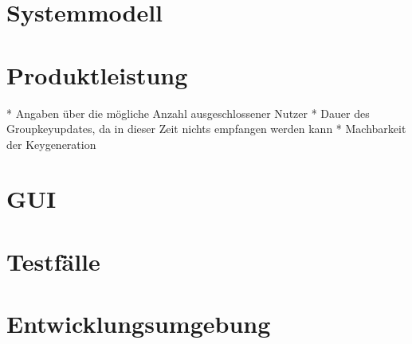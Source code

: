 \documentclass[a4paper,10pt]{article}
\begin{document}
\section{Systemmodell}

\section{Produktleistung}
* Angaben über die mögliche Anzahl ausgeschlossener Nutzer
* Dauer des Groupkeyupdates, da in dieser Zeit nichts empfangen werden kann
* Machbarkeit der Keygeneration

\section{GUI}

\section{Testfälle}

\section{Entwicklungsumgebung}

\clearpage

\end{document}
